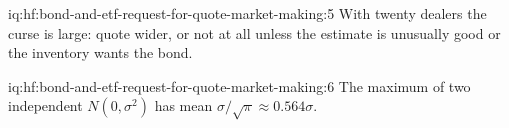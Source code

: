 \begin{solution}{iq:hf:bond-and-etf-request-for-quote-market-making:5}
With twenty dealers the curse is large: quote wider, or not at all unless the estimate is unusually good or the inventory wants the bond.
\end{solution}

\begin{solution}{iq:hf:bond-and-etf-request-for-quote-market-making:6}
The maximum of two independent $N(0,\sigma^2)$ has mean $\sigma/\sqrt\pi\approx0.564\sigma$.
\end{solution}
